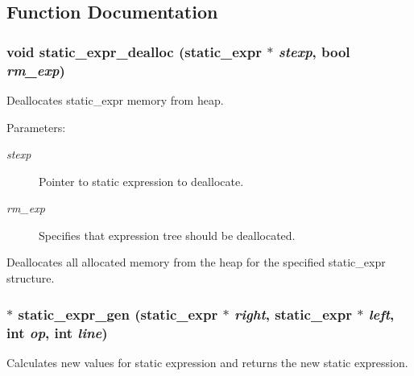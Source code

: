 \subsection{Function Documentation}
\subsubsection{\setlength{\rightskip}{0pt plus 5cm}void static\_\-expr\_\-dealloc ({\bf static\_\-expr} $\ast$ {\em stexp}, {\bf bool} {\em rm\_\-exp})}\label{static_8h_a2}


Deallocates static\_\-expr memory from heap.

\begin{Desc}
\item[Parameters: ]\par
\begin{description}
\item[{\em 
stexp}]Pointer to static expression to deallocate. \item[{\em 
rm\_\-exp}]Specifies that expression tree should be deallocated.\end{description}
\end{Desc}
Deallocates all allocated memory from the heap for the specified static\_\-expr structure. 
\subsubsection{$\ast$ static\_\-expr\_\-gen ({\bf static\_\-expr} $\ast$ {\em right}, {\bf static\_\-expr} $\ast$ {\em left}, int {\em op}, int {\em line})}\label{static_8h_a1}


Calculates new values for static expression and returns the new static expression.

